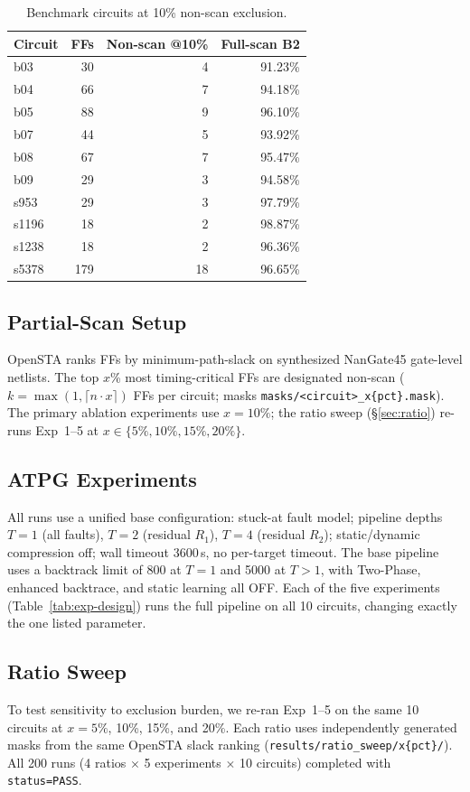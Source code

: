 \documentclass[conference]{IEEEtran}
\begin{document}
\begin{table}[t]
\caption{Benchmark circuits at 10\% non-scan exclusion.}
\label{tab:bench}
\centering
\footnotesize
\begin{tabular}{@{}lrrr@{}}
\toprule
Circuit & FFs & Non-scan @10\% & Full-scan B2 \\
\midrule
b03   & 30   & 4   & 91.23\% \\
b04   & 66   & 7   & 94.18\% \\
b05   & 88   & 9   & 96.10\% \\
b07   & 44   & 5   & 93.92\% \\
b08   & 67   & 7   & 95.47\% \\
b09   & 29   & 3   & 94.58\% \\
s953  & 29   & 3   & 97.79\% \\
s1196 & 18   & 2   & 98.87\% \\
s1238 & 18   & 2   & 96.36\% \\
s5378 & 179  & 18  & 96.65\% \\
\bottomrule
\end{tabular}
\end{table}

\subsection{Partial-Scan Setup}
OpenSTA ranks FFs by minimum-path-slack on synthesized NanGate45 gate-level
netlists. The top $x$\% most timing-critical FFs are designated non-scan
($k{=}\max(1,\lceil n{\cdot}x\rceil)$ FFs per circuit; masks
\texttt{masks/<circuit>\_x\{pct\}.mask}). The primary ablation experiments use
$x{=}10\%$; the ratio sweep (\S\ref{sec:ratio}) re-runs Exp~1--5 at
$x\in\{5\%,10\%,15\%,20\%\}$.

\subsection{ATPG Experiments}
All runs use a unified base configuration: stuck-at fault model; pipeline depths
$T{=}1$ (all faults), $T{=}2$ (residual $R_1$), $T{=}4$ (residual $R_2$);
static/dynamic compression off; wall timeout 3600\,s, no per-target timeout.
The base pipeline uses a backtrack limit of 800 at $T{=}1$ and 5000 at
$T{>}1$, with Two-Phase, enhanced backtrace, and static learning all OFF. Each
of the five experiments (Table~\ref{tab:exp-design}) runs the full pipeline on
all 10 circuits, changing exactly the one listed parameter.

\subsection{Ratio Sweep}
\label{sec:ratio-setup}
To test sensitivity to exclusion burden, we re-ran Exp~1--5 on the same 10
circuits at $x{=}5\%$, 10\%, 15\%, and 20\%. Each ratio uses independently
generated masks from the same OpenSTA slack ranking
(\texttt{results/ratio\_sweep/x\{pct\}/}). All 200 runs (4 ratios $\times$ 5
experiments $\times$ 10 circuits) completed with \texttt{status=PASS}.
\end{document}
